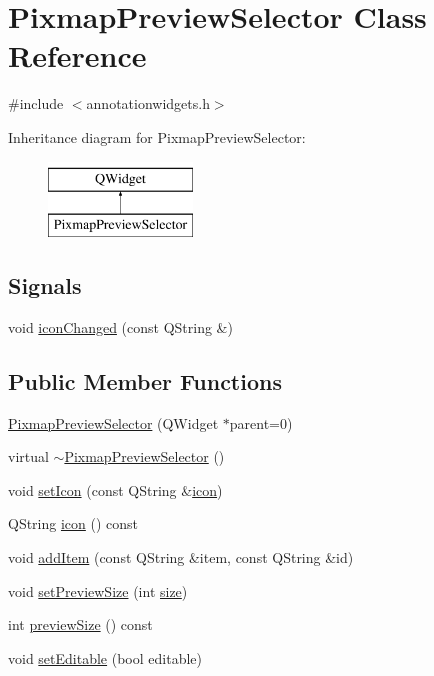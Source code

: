 \hypertarget{classPixmapPreviewSelector}{\section{Pixmap\+Preview\+Selector Class Reference}
\label{classPixmapPreviewSelector}
}


{\ttfamily \#include $<$annotationwidgets.\+h$>$}

Inheritance diagram for Pixmap\+Preview\+Selector\+:\begin{figure}[H]
\begin{center}
\leavevmode
\includegraphics[height=2.000000cm]{classPixmapPreviewSelector}
\end{center}
\end{figure}
\subsection*{Signals}
\begin{DoxyCompactItemize}
\item 
void \hyperlink{classPixmapPreviewSelector_ae821122d876d6cccfbf007487b4edbc8}{icon\+Changed} (const Q\+String \&)
\end{DoxyCompactItemize}
\subsection*{Public Member Functions}
\begin{DoxyCompactItemize}
\item 
\hyperlink{classPixmapPreviewSelector_a3e82be75dbd0a5bdd2366b24facab887}{Pixmap\+Preview\+Selector} (Q\+Widget $\ast$parent=0)
\item 
virtual \hyperlink{classPixmapPreviewSelector_a0e303cb6b993c656dd1f783efa398ecc}{$\sim$\+Pixmap\+Preview\+Selector} ()
\item 
void \hyperlink{classPixmapPreviewSelector_a9ba6710637ffc9b0f5c8eac83aaec671}{set\+Icon} (const Q\+String \&\hyperlink{classPixmapPreviewSelector_a04ef584f4a20313aca10221dc4bcc0e9}{icon})
\item 
Q\+String \hyperlink{classPixmapPreviewSelector_a04ef584f4a20313aca10221dc4bcc0e9}{icon} () const 
\item 
void \hyperlink{classPixmapPreviewSelector_ac4729c46cc585aba462dd2eebcb74a92}{add\+Item} (const Q\+String \&item, const Q\+String \&id)
\item 
void \hyperlink{classPixmapPreviewSelector_a8fbaac78a3711252429b803d4351a4a3}{set\+Preview\+Size} (int \hyperlink{synctex__parser_8c_aa23c661441688350614bd6a350d2b6ff}{size})
\item 
int \hyperlink{classPixmapPreviewSelector_a77ce6555529ea01d6bae1d6d506fbb44}{preview\+Size} () const 
\item 
void \hyperlink{classPixmapPreviewSelector_a0adf1797472299f46c16f4ba881a1cc3}{set\+Editable} (bool editable)
\end{DoxyCompactItemize}


